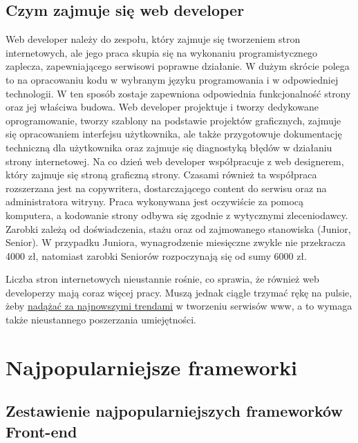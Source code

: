 \documentclass[12pt]{report}
\begin{document}
	\newpage
	\section{Czym zajmuje się web developer}
	Web developer należy do zespołu, który zajmuje się tworzeniem stron internetowych, ale jego praca skupia się na wykonaniu programistycznego zaplecza, zapewniającego serwisowi poprawne działanie. W dużym skrócie polega to na opracowaniu kodu w wybranym języku programowania i w odpowiedniej technologii. W ten sposób zostaje zapewniona odpowiednia funkcjonalność strony oraz jej właściwa budowa. Web developer projektuje i tworzy dedykowane oprogramowanie, tworzy szablony na podstawie projektów graficznych, zajmuje się opracowaniem interfejsu użytkownika, ale także przygotowuje dokumentację techniczną dla użytkownika oraz zajmuje się diagnostyką błędów w działaniu strony internetowej.
	Na co dzień web developer współpracuje z web designerem, który zajmuje się stroną graficzną strony. Czasami również ta współpraca rozszerzana jest na copywritera, dostarczającego content do serwisu oraz na administratora witryny. Praca wykonywana jest oczywiście za pomocą komputera, a kodowanie strony odbywa się zgodnie z wytycznymi zleceniodawcy. Zarobki zależą od doświadczenia, stażu oraz od zajmowanego stanowiska (Junior, Senior). W przypadku Juniora, wynagrodzenie miesięczne zwykle nie przekracza 4000 zł, natomiast zarobki Seniorów rozpoczynają się od sumy 6000 zł.
	\par
	Liczba stron internetowych nieustannie rośnie, co sprawia, że również web developerzy mają coraz więcej pracy. Muszą jednak ciągle trzymać rękę na pulsie, żeby \underline{nadążać za najnowszymi trendami} w tworzeniu serwisów www, a to wymaga także nieustannego poszerzania umiejętności.
	\cite{webd}
	
	\chapter{Najpopularniejsze frameworki}
	\section{Zestawienie najpopularniejszych frameworków Front-end}
	
\end{document}
